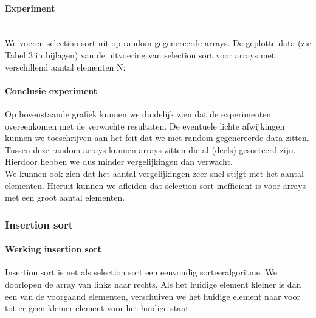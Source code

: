 \documentclass[11pt, a4paper]{article}
\begin{document}
\paragraph{Experiment}\hspace{0pt}\\
We voeren selection sort uit op random gegenereerde arrays. De geplotte data (zie Tabel 3 in bijlagen) van de uitvoering van selection sort voor arrays met verschillend aantal elementen N:\\
\paragraph{Conclusie experiment} Op bovenstaande grafiek kunnen we duidelijk zien dat de experimenten overeenkomen met de verwachte resultaten. De eventuele lichte afwijkingen kunnen we toeschrijven aan het feit dat we met random gegenereerde data zitten. Tussen deze random arrays kunnen arrays zitten die al (deels) gesorteerd zijn. Hierdoor hebben we dus minder vergelijkingen dan verwacht.\\
\indent We kunnen ook zien dat het aantal vergelijkingen zeer snel stijgt met het aantal elementen. Hieruit kunnen we afleiden dat selection sort ineffic\"ient is voor arrays met een groot aantal elementen.

\newpage
\subsubsection*{Insertion sort}
\paragraph{Werking insertion sort} Insertion sort is net als selection sort een eenvoudig sorteeralgoritme. We doorlopen de array van links naar rechts. Als het huidige element kleiner is dan een van de voorgaand elementen, verschuiven we het huidige element naar voor tot er geen kleiner element voor het huidige staat.
\end{document}
